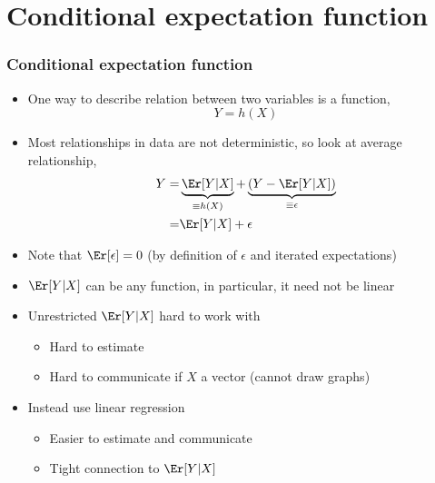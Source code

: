 \section{Conditional expectation function}

\begin{frame}[allowframebreaks]
  \frametitle{Conditional expectation function}
  \begin{itemize}
  \item One way to describe relation between two variables is a
    function, 
    \[ Y = h(X) \]
  \item Most relationships in data are not deterministic, so look at
    average relationship,
    \begin{align*}
      Y = & \underbrace{\Er[Y|X]}_{\equiv h(X)} + \underbrace{\left(Y
          - \Er[Y|X]\right)}_{\equiv \epsilon}  \\  
      = & \Er[Y|X] + \epsilon
    \end{align*}
  \item Note that $\Er[\epsilon] = 0$ (by definition of $\epsilon$ and
    iterated expectations)
  \item $\Er[Y|X]$ can be any function, in particular, it need not be
    linear
  \item Unrestricted $\Er[Y|X]$ hard to work with
    \begin{itemize} 
    \item Hard to estimate
    \item Hard to communicate if $X$ a vector (cannot draw graphs) 
    \end{itemize}
  \item Instead use linear regression
    \begin{itemize}
    \item Easier to estimate and communicate
    \item Tight connection to $\Er[Y|X]$
    \end{itemize}
  \end{itemize}
\end{frame}  

